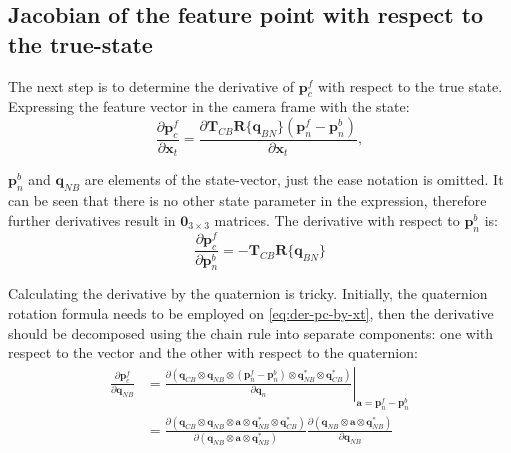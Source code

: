 \subsection*{Jacobian of the feature point with respect to the true-state} 

The next step is to determine the derivative of $\mathbf{p}_c^f$ with respect to the true state. Expressing the feature vector in the camera frame with the state:
\begin{equation}
    \frac{\partial\mathbf{p}_c^f}{\partial\mathbf{x}_t}=
    \frac{\partial\mathbf{T}_{CB}\mathbf{R}\{\mathbf{q}_{BN}\}(\mathbf{p}_n^f-\mathbf{p}_n^b)}{\partial\mathbf{x}_t},
    \label{eq:der-pc-by-xt}
\end{equation}

$\mathbf{p}_n^b$ and $\mathbf{q}_{NB}$ are elements of the state-vector, just the ease notation is omitted. It can be seen that there is no other state parameter in the expression, therefore further derivatives result in $\mathbf{0}_{3\times 3}$ matrices. The derivative with respect to $\mathbf{p}_n^b$ is:
\begin{equation}
    \frac{\partial\mathbf{p}_c^f}{\partial\mathbf{p}_n^b}=-\mathbf{T}_{CB}\mathbf{R}\{\mathbf{q}_{BN}\}
\end{equation}

Calculating the derivative by the quaternion is tricky. Initially, the quaternion rotation formula needs to be employed on \eqref{eq:der-pc-by-xt}, then the derivative should be decomposed using the chain rule into separate components: one with respect to the vector and the other with respect to the quaternion:
\begin{equation}
\begin{aligned}
    \frac{\partial\mathbf{p}_c^f}{\partial\mathbf{q}_{NB}}&=\left.
    \frac{\partial\left(\mathbf{q}_{CB}\otimes\mathbf{q}_{NB}\otimes(\mathbf{p}_n^f-\mathbf{p}_n^b) \otimes\mathbf{q}_{NB}^*\otimes\mathbf{q}_{CB}^*\right)}{\partial\mathbf{q}_n} \right\vert_{\mathbf{a}=\mathbf{p}_n^f-\mathbf{p}_n^b} \\ 
    &=\frac{\partial\left(\mathbf{q}_{CB}\otimes\mathbf{q}_{NB}\otimes\mathbf{a} \otimes\mathbf{q}_{NB}^*\otimes\mathbf{q}_{CB}^*\right)}{\partial\left(\mathbf{q}_{NB}\otimes\mathbf{a} \otimes\mathbf{q}_{NB}^*\right)}
    \frac{\partial\left(\mathbf{q}_{NB}\otimes\mathbf{a}\otimes\mathbf{q}_{NB}^*\right)}{\partial\mathbf{q}_{NB}}
\end{aligned}
\end{equation}

